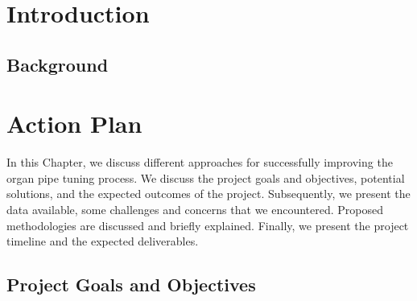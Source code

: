 \documentclass{psu-report}
\begin{document}

\tableofcontents
\clearpage





\startbody

\chapter{Introduction}


\section{Background}


\chapter{Action Plan}

In this Chapter, we discuss different approaches for successfully improving the
organ pipe tuning process.
We discuss the project goals and objectives, potential solutions, and the
expected outcomes of the project.
Subsequently, we present the data available, some challenges and concerns that
we encountered.
Proposed methodologies are discussed and briefly explained.
Finally, we present the project timeline and the expected deliverables.

\section{Project Goals and Objectives}
\end{document}
